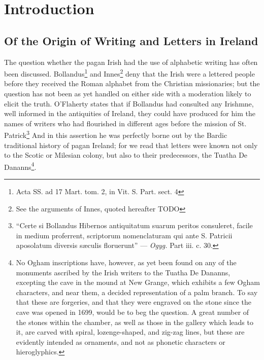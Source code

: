 \documentclass[11pt,oneside]{memoir}
\begin{document}
\newpage
\tableofcontents
\newpage
\setcounter{page}{1}

\chapter*{Introduction}
\section{Of the Origin of Writing and Letters in Ireland}
The question whether the pagan Irish had the use of alphabetic writing has often been discussed.
Bollandus\footnote{Acta SS. ad 17 Mart. tom. 2, in Vit. S. Part. sect. 4}
and Innes\footnote{See the arguments of Innes, quoted hereafter TODO}
deny that the Irish were a lettered people before they received the Roman alphabet from the Christian missionaries;
but the question has not been as yet handled on either side with a moderation likely to elicit the truth.
O'Flaherty states that if Bollandus had consulted any Irishmne, well informed in the antiquities of Ireland, they could have produced for him the names of writers who had flourished in different ages before the mission of St. Patrick\footnote{``Certe si Bollandus Hibernos antiquitatum suarum peritos consuleret, facile in medium proferrent, scriptorum nomenclaturam qui ante S. Patricii aposolatum diversis sæculis floruerunt'' --- \textit{Ogyg.} Part iii. c. 30.}
And in this assertion he was perfectly borne out by the Bardic traditional history of pagan Ireland; for we read that letters were known not only to the Scotic or Milesian colony, but also to their predecessors, the Tuatha De Dananns\footnote{No Ogham inscriptions have, however, as yet been found on any of the monuments ascribed by the Irish writers to the Tuatha De Dananns, excepting the cave in the mound at New Grange, which exhibits a few Ogham characters, and near them, a decided representation of a palm branch. To say that these are forgeries, and that they were engraved on the stone since the cave was opened in 1699, would be to beg the question. A great number of the stones within the chamber, as well as those in the gallery which leads to it, are carved with spiral, lozenge-shaped, and zig-zag lines, but these are evidently intended as ornaments, and not as phonetic characters or hieroglyphics.}.
\end{document}
